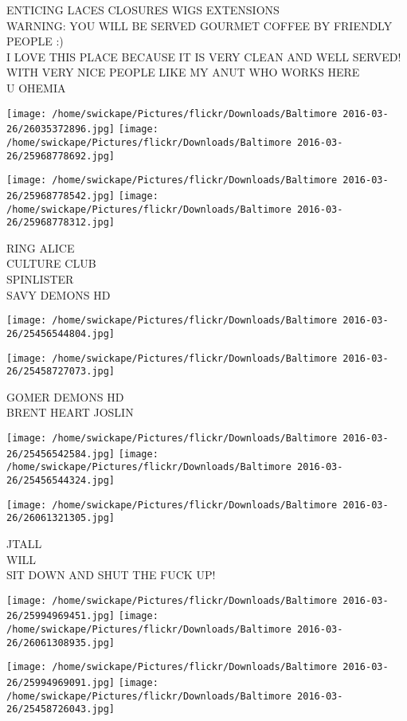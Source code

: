 \documentclass[10pt,letterpaper]{article}
\begin{document}
ENTICING LACES CLOSURES WIGS EXTENSIONS\\
WARNING: YOU WILL BE SERVED GOURMET COFFEE BY FRIENDLY PEOPLE :)\\
I LOVE THIS PLACE BECAUSE IT IS VERY CLEAN AND WELL SERVED!  WITH VERY NICE PEOPLE LIKE MY ANUT WHO WORKS HERE\\
U OHEMIA
\pagebreak

\texttt{[image: /home/swickape/Pictures/flickr/Downloads/Baltimore 2016-03-26/26035372896.jpg]}
\texttt{[image: /home/swickape/Pictures/flickr/Downloads/Baltimore 2016-03-26/25968778692.jpg]}

\texttt{[image: /home/swickape/Pictures/flickr/Downloads/Baltimore 2016-03-26/25968778542.jpg]}
\texttt{[image: /home/swickape/Pictures/flickr/Downloads/Baltimore 2016-03-26/25968778312.jpg]}

RING ALICE\\
CULTURE CLUB\\
SPINLISTER\\
SAVY DEMONS HD
\pagebreak

\texttt{[image: /home/swickape/Pictures/flickr/Downloads/Baltimore 2016-03-26/25456544804.jpg]}

\vspace{0.25in}
\texttt{[image: /home/swickape/Pictures/flickr/Downloads/Baltimore 2016-03-26/25458727073.jpg]}

GOMER DEMONS HD\\
BRENT HEART JOSLIN
\pagebreak

\texttt{[image: /home/swickape/Pictures/flickr/Downloads/Baltimore 2016-03-26/25456542584.jpg]}
\texttt{[image: /home/swickape/Pictures/flickr/Downloads/Baltimore 2016-03-26/25456544324.jpg]}

\vspace{0.25in}
\texttt{[image: /home/swickape/Pictures/flickr/Downloads/Baltimore 2016-03-26/26061321305.jpg]}

JTALL\\
WILL\\
SIT DOWN AND SHUT THE FUCK UP!
\pagebreak

\texttt{[image: /home/swickape/Pictures/flickr/Downloads/Baltimore 2016-03-26/25994969451.jpg]}
\texttt{[image: /home/swickape/Pictures/flickr/Downloads/Baltimore 2016-03-26/26061308935.jpg]}

\texttt{[image: /home/swickape/Pictures/flickr/Downloads/Baltimore 2016-03-26/25994969091.jpg]}
\texttt{[image: /home/swickape/Pictures/flickr/Downloads/Baltimore 2016-03-26/25458726043.jpg]}
\end{document}
